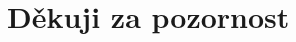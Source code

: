 \documentclass[aspectratio=169]{beamer}
\begin{document}
\section{Děkuji za pozornost}
\begin{comment}
\begin{frame}{Protokol WebRTC}
    \centering
    \begin{tikzpicture}
        \pause
        \node[draw] (client1) at (-6, 0) {Klient 1};
        \node[draw] (client2) at (6, 0) {Klient 2};
        \pause
        \node[draw] (router1) at (-3.5, 0) {Router 1};
        \draw[green, <->] (client1) -- (router1);
        \node[draw] (router2) at (3.5, 0) {Router 2};
        \draw[green, <->] (client2) -- (router2);
        \pause
        \node[draw] (stun) at (0,1.5) {STUN server};
        \draw[yellow, <->] (router1) -- (stun);
        \draw[yellow, <->] (router2) -- (stun);
        \pause
        \node[draw, alt=<8>{orange}] (signalling) at (0,-1.5) {Signalling server};
        \draw[red, <->] (router1) -- (signalling);
        \draw[red, <->] (router2) -- (signalling);
        \pause
        \onslide<6> \draw[cyan, <->] (router1) -- (router2) node[midway, anchor=south]
        {Data};
        \pause
        \node[draw] (turn) at (0,0) {TURN server};
        \draw[cyan, <->] (router1) -- (turn) node[midway, anchor=south]
        {Data};
        \draw[cyan, <->] (router2) -- (turn) node[midway, anchor=south]
        {Data};
    \end{tikzpicture}
\end{frame}


\end{comment}
\end{document}

